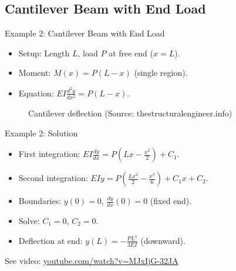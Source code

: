 \documentclass{beamer}
\begin{document}
\subsection{Cantilever Beam with End Load}
\begin{frame}{Example 2: Cantilever Beam with End Load}
    \begin{itemize}
        \item Setup: Length \( L \), load \( P \) at free end (\( x = L \)).
        \item Moment: \( M(x) = P(L - x) \) (single region).
        \item Equation: \( EI \frac{d^2y}{dx^2} = P(L - x) \).
    \end{itemize}
    \begin{figure}
        \centering
        \caption{Cantilever deflection (Source: thestructuralengineer.info)}
    \end{figure}
\end{frame}

\begin{frame}{Example 2: Solution}
    \begin{itemize}
        \item First integration: \( EI \frac{dy}{dx} = P(Lx - \frac{x^2}{2}) + C_1 \).
        \item Second integration: \( EI y = P(\frac{Lx^2}{2} - \frac{x^3}{6}) + C_1 x + C_2 \).
        \item Boundaries: \( y(0) = 0 \), \( \frac{dy}{dx}(0) = 0 \) (fixed end).
        \item Solve: \( C_1 = 0 \), \( C_2 = 0 \).
        \item Deflection at end: \( y(L) = -\frac{PL^3}{3EI} \) (downward).
    \end{itemize}
    See video: \href{https://www.youtube.com/watch?v=MJxIjG-32JA}{youtube.com/watch?v=MJxIjG-32JA}
\end{frame}
\end{document}
